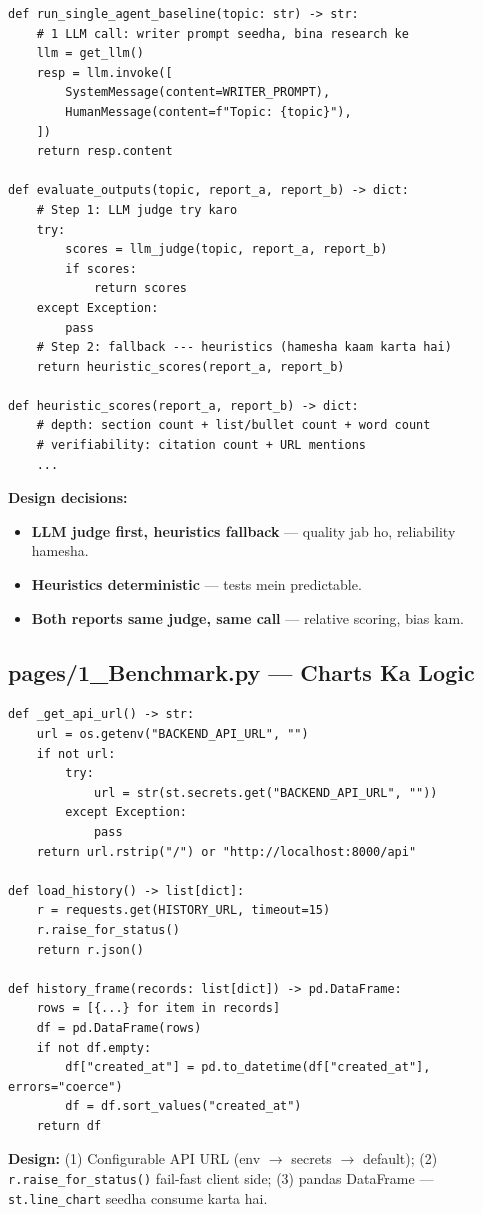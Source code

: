 \begin{codestorybox}
\begin{lstlisting}[style=pythonstyle, caption={evaluator.py --- poora flow}]
def run_single_agent_baseline(topic: str) -> str:
    # 1 LLM call: writer prompt seedha, bina research ke
    llm = get_llm()
    resp = llm.invoke([
        SystemMessage(content=WRITER_PROMPT),
        HumanMessage(content=f"Topic: {topic}"),
    ])
    return resp.content

def evaluate_outputs(topic, report_a, report_b) -> dict:
    # Step 1: LLM judge try karo
    try:
        scores = llm_judge(topic, report_a, report_b)
        if scores:
            return scores
    except Exception:
        pass
    # Step 2: fallback --- heuristics (hamesha kaam karta hai)
    return heuristic_scores(report_a, report_b)

def heuristic_scores(report_a, report_b) -> dict:
    # depth: section count + list/bullet count + word count
    # verifiability: citation count + URL mentions
    ...
\end{lstlisting}

\textbf{Design decisions:}
\begin{itemize}
\item \textbf{LLM judge first, heuristics fallback} --- quality jab ho, reliability hamesha.
\item \textbf{Heuristics deterministic} --- tests mein predictable.
\item \textbf{Both reports same judge, same call} --- relative scoring, bias kam.
\end{itemize}
\end{codestorybox}

\subsection{pages/1\_Benchmark.py --- Charts Ka Logic}

\begin{codestorybox}
\begin{lstlisting}[style=pythonstyle, caption={Benchmark page API client}]
def _get_api_url() -> str:
    url = os.getenv("BACKEND_API_URL", "")
    if not url:
        try:
            url = str(st.secrets.get("BACKEND_API_URL", ""))
        except Exception:
            pass
    return url.rstrip("/") or "http://localhost:8000/api"

def load_history() -> list[dict]:
    r = requests.get(HISTORY_URL, timeout=15)
    r.raise_for_status()
    return r.json()

def history_frame(records: list[dict]) -> pd.DataFrame:
    rows = [{...} for item in records]
    df = pd.DataFrame(rows)
    if not df.empty:
        df["created_at"] = pd.to_datetime(df["created_at"], errors="coerce")
        df = df.sort_values("created_at")
    return df
\end{lstlisting}

\textbf{Design:} (1) Configurable API URL (env $\rightarrow$ secrets $\rightarrow$ default); (2) \texttt{r.raise\_for\_status()} fail-fast client side; (3) pandas DataFrame --- \texttt{st.line\_chart} seedha consume karta hai.
\end{codestorybox}


